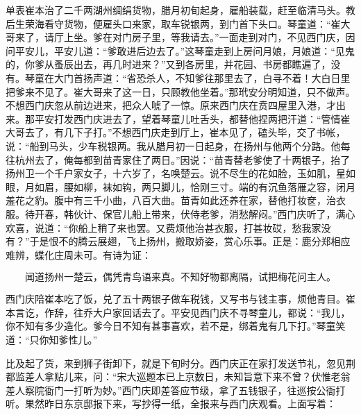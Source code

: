 单表崔本治了二千两湖州绸绢货物，腊月初旬起身，雇船装载，赶至临清马头。教后生荣海看守货物，便雇头口来家，取车锐银两，到门首下头口。琴童道：“崔大哥来了，请厅上坐。爹在对门房子里，等我请去。”一面走到对门，不见西门庆，因问平安儿，平安儿道：“爹敢进后边去了。”这琴童走到上房问月娘，月娘道：“见鬼的，你爹从蚤辰出去，再几时进来？”又到各房里，并花园、书房都瞧遍了，没有。琴童在大门首扬声道：“省恐杀人，不知爹往那里去了，白寻不着！大白日里把爹来不见了。崔大哥来了这一日，只顾教他坐着。”那玳安分明知道，只不做声。不想西门庆忽从前边进来，把众人唬了一惊。原来西门庆在贲四屋里入港，才出来。那平安打发西门庆进去了，望着琴童儿吐舌头，都替他捏两把汗道：“管情崔大哥去了，有几下子打。”不想西门庆走到厅上，崔本见了，磕头毕，交了书帐，说：“船到马头，少车税银两。我从腊月初一日起身，在扬州与他两个分路。他每往杭州去了，俺每都到苗青家住了两日。”因说：“苗青替老爹使了十两银子，抬了扬州卫一个千户家女子，十六岁了，名唤楚云。说不尽生的花如脸，玉如肌，星如眼，月如眉，腰如柳，袜如钩，两只脚儿，恰刚三寸。端的有沉鱼落雁之容，闭月羞花之豹。腹中有三千小曲，八百大曲。苗青如此还养在家，替他打妆奁，治衣服。待开春，韩伙计、保官儿船上带来，伏侍老爹，消愁解闷。”西门庆听了，满心欢喜，说道：“你船上稍了来也罢。又费烦他治甚衣服，打甚妆砹，愁我家没有？”于是恨不的腾云展翅，飞上扬州，搬取娇姿，赏心乐事。正是：鹿分郑相应难辨，蝶化庄周未可。有诗为证：

\[
闻道扬州一楚云，偶凭青鸟语来真。
不知好物都离隔，试把梅花问主人。
\]

西门庆陪崔本吃了饭，兑了五十两银子做车税钱，又写书与钱主事，烦他青目。崔本言讫，作辞，往乔大户家回话去了。平安见西门庆不寻琴童儿，都说：“我儿，你不知有多少造化。爹今日不知有甚事喜欢，若不是，绑着鬼有几下打。”琴童笑道：“只你知爹性儿。”

比及起了货，来到狮子街卸下，就是下旬时分。西门庆正在家打发送节礼，忽见荆都监差人拿贴儿来，问：“宋大巡题本已上京数日，未知旨意下来不曾？伏惟老翁差人察院衙门一打听为妙。”西门庆即差答应节级，拿了五钱银子，往巡按公衙打听。果然昨日东京邸报下来，写抄得一纸，全报来与西门庆观看。上面写着：

